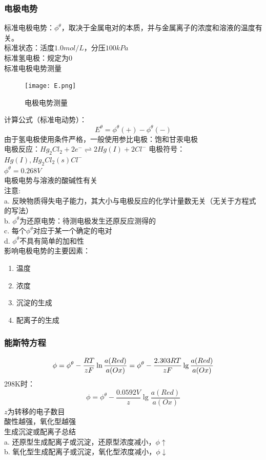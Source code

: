 \documentclass[utf8,a4paper,12pt]{ctexart}
\begin{document}
\subsubsection{电极电势}
标准电极电势：$\phi^{\theta}$，取决于金属电对的本质，并与金属离子的浓度和溶液的温度有关。\\
标准状态：活度$1.0mol/L$，分压$100kPa$\\
标准氢电极：规定为0\\
标准电极电势测量\\
\begin{figure}[H]
\centering
\texttt{[image: E.png]}
\caption{电极电势测量}
\end{figure}
计算公式（标准电动势）：
\begin{equation}
E^{\theta} = \phi^{\theta}(+) - \phi^{\theta}(-)
\end{equation}
由于氢电极使用条件严格，一般使用参比电极：饱和甘汞电极\\
电极反应：$Hg_{2}Cl_{2} + 2e^{-} \rightleftharpoons 2Hg(I) + 2Cl^{-}$
电极符号：$Hg(I), Hg_{2}Cl_{2}(s)Cl^{-}$\\
$\phi^{\theta} = 0.268V$\\
电极电势与溶液的酸碱性有关\\
注意: \\
a. 反映物质得失电子能力，其大小与电极反应的化学计量数无关（无关于方程式的写法）\\
b. $\phi^{\theta}$为还原电势：待测电极发生还原反应测得的\\
c. 每个$\phi^{\theta}$对应于某一个确定的电对\\
d. $\phi^{\theta}$不具有简单的加和性\\
影响电极电势的主要因素：
\begin{enumerate}[(1)]
\item 温度
\item 浓度
\item 沉淀的生成
\item 配离子的生成
\end{enumerate}
\subsubsection{能斯特方程}
\begin{equation}
\centering
\phi = \phi^{\theta} - \frac{RT}{zF}\ln\frac{a(Red)}{a(Ox)} = \phi^{\theta} - \frac{2.303RT}{zF}\lg\frac{a(Red)}{a(Ox)}
\end{equation}
298K时：
\[
\phi = \phi^{\theta} - \frac{0.0592V}{z}\lg\frac{a(Red)}{a(Ox)}
\]
$z$为转移的电子数目\\
酸性越强，氧化型越强\\
生成沉淀或配离子总结\\
a. 还原型生成配离子或沉淀，还原型浓度减小，$\phi \uparrow$\\
b. 氧化型生成配离子或沉淀，氧化型浓度减小，$\phi \downarrow$\\
\end{document}
